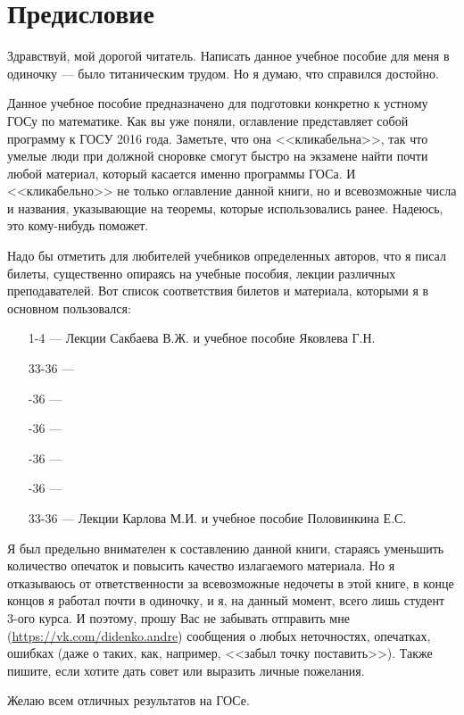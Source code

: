 \chapter{Предисловие}
Здравствуй, мой дорогой читатель. Написать данное учебное пособие для меня в одиночку --- было титаническим трудом. Но я думаю, что справился достойно.

Данное учебное пособие предназначено для подготовки конкретно к устному ГОСу по математике. Как вы уже поняли, оглавление представляет собой программу к ГОСУ 2016 года. Заметьте, что она <<кликабельна>>, так что умелые люди при должной сноровке смогут быстро на экзамене найти почти любой материал, который касается именно программы ГОСа. И <<кликабельно>> не только оглавление данной книги, но и всевозможные числа и названия, указывающие на теоремы, которые использовались ранее. Надеюсь, это кому-нибудь поможет. 

Надо бы отметить для любителей учебников определенных авторов, что я писал билеты, существенно опираясь на учебные пособия, лекции различных преподавателей. Вот список соответствия билетов и материала, которыми я в основном пользовался:
\begin{itemize}
\item[1-4]
\; --- \: Лекции Сакбаева В.Ж. и учебное пособие Яковлева Г.Н.
\item[33-36]
\; --- \:
\item[\sffamily 33-36]
\; --- \:
\item[\sffamily 33-36]
\; --- \:
\item[\sffamily 33-36]
\; --- \:
\item[\sffamily 33-36]
\; --- \:
\item[33-36]
\; --- \: Лекции Карлова М.И. и учебное пособие Половинкина Е.С.
\end{itemize}

Я был предельно внимателен к составлению данной книги, стараясь уменьшить количество опечаток и повысить качество излагаемого материала. Но я отказываюсь от ответственности за всевозможные недочеты в этой книге, в конце концов я работал почти в одиночку, и я, на данный момент, всего лишь студент 3-ого курса. И поэтому, прошу Вас не забывать отправить мне (\url{https://vk.com/didenko.andre}) сообщения о любых неточностях, опечатках, ошибках (даже о таких, как, например, <<забыл точку поставить>>). Также пишите, если хотите дать совет или выразить личные пожелания. 
 
\vspace*{\baselineskip}
Желаю всем отличных результатов на ГОСе.